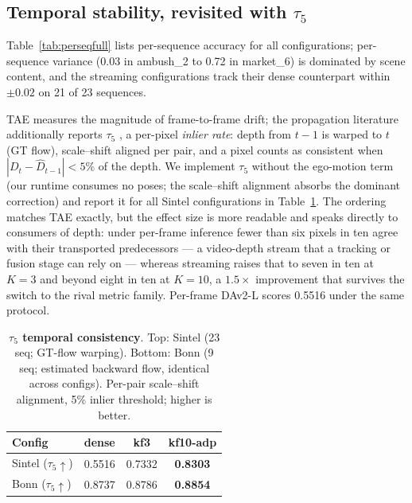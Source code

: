 \documentclass[10pt,twocolumn]{article}
\begin{document}
\subsection{Temporal stability, revisited with $\tau_5$}
\label{sec:tau5}
Table~\ref{tab:perseqfull} lists per-sequence accuracy for all
configurations; per-sequence variance (0.03 in ambush\_2 to 0.72 in
market\_6) is dominated by scene content, and the streaming configurations
track their dense counterpart within $\pm 0.02$ on 21 of 23 sequences.


TAE measures the magnitude of frame-to-frame drift; the propagation
literature additionally reports $\tau_5$
\cite{velodepth}, a per-pixel \emph{inlier rate}: depth from $t{-}1$ is
warped to $t$ (GT flow), scale--shift aligned per pair, and a pixel counts
as consistent when $|D_t - \widehat{D}_{t-1}| < 5\%$ of the depth. We
implement $\tau_5$ without the ego-motion term (our runtime consumes no
poses; the scale--shift alignment absorbs the dominant correction) and
report it for all Sintel configurations in Table~\ref{tab:tau5}. The
ordering matches TAE exactly, but the effect size is more readable and
speaks directly to consumers of depth: under per-frame inference fewer
than six pixels in ten agree with their transported predecessors --- a
video-depth stream that a tracking or fusion stage can rely on --- whereas
streaming raises that to seven in ten at $K{=}3$ and beyond eight in ten at
$K{=}10$, a $1.5\times$ improvement that survives the switch to the rival
metric family. Per-frame DAv2-L scores 0.5516 under the same protocol.

\begin{table}[t]
\centering\small
\caption{\textbf{$\tau_5$ temporal consistency}. Top: Sintel (23 seq;
GT-flow warping). Bottom: Bonn (9 seq; estimated backward flow, identical
across configs). Per-pair scale--shift alignment, 5\% inlier threshold;
higher is better.}
\label{tab:tau5}
\begin{tabular}{lccc}
\toprule
Config & dense & kf3 & kf10-adp\\
\midrule
Sintel ($\tau_5{\uparrow}$) & 0.5516 & 0.7332 & \textbf{0.8303}\\
Bonn ($\tau_5{\uparrow}$) & 0.8737 & 0.8786 & \textbf{0.8854}\\
\bottomrule
\end{tabular}
\end{table}
\end{document}
